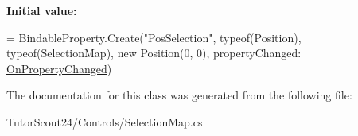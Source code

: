 {\bfseries Initial value\+:}
\begin{DoxyCode}
= BindableProperty.Create(\textcolor{stringliteral}{"PosSelection"}, typeof(Position), typeof(SelectionMap),
            \textcolor{keyword}{new} Position(0, 0), propertyChanged: \mbox{\hyperlink{class_tutor_scout24_1_1_controls_1_1_selection_map_ab2558decc7d57c270b0fe0f5977be530}{OnPropertyChanged}})
\end{DoxyCode}


The documentation for this class was generated from the following file\+:\begin{DoxyCompactItemize}
\item 
Tutor\+Scout24/\+Controls/Selection\+Map.\+cs\end{DoxyCompactItemize}
